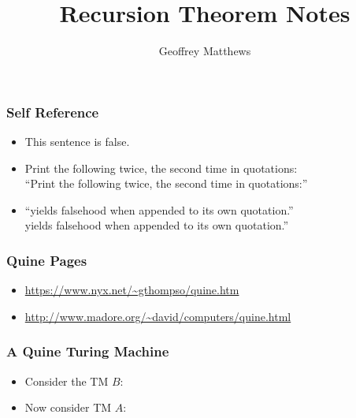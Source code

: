 \documentclass{beamer}
\title{Recursion Theorem Notes}
\author{Geoffrey Matthews}
\newcommand{\bfr}[1]{\begin{frame}[fragile]\frametitle{{ #1 }}}
\begin{document}
\begin{frame}
\maketitle

\end{frame}

\bfr{Self Reference}
\begin{itemize}
\item This sentence is false.\pause
\item Print the following twice, the second time in quotations:\\
  ``Print the following twice, the second time in quotations:''\pause
  \item ``yields falsehood when appended to its own quotation.''\\
  yields falsehood when appended to its own quotation.''
\end{itemize}

\end{frame}

\bfr{Quine Pages}
\begin{itemize}
\item  \url{https://www.nyx.net/~gthompso/quine.htm}
\item \url{http://www.madore.org/~david/computers/quine.html}
\end{itemize}
\end{frame}

\bfr{A Quine Turing Machine}
\begin{itemize}
\item Consider the TM $B$:
\item Now consider TM $A$:
  
  \end{itemize}
\end{frame}
\end{document}
